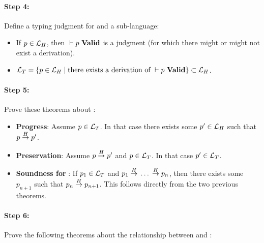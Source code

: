 \paragraph{Step 4:} Define a typing judgment for \highlang and a sub-language:

\begin{itemize}
\item If $p \in \mathcal{L}_H$, then ${} |- {p}\ \mathbf{Valid}$ is a judgment (for which there
  might or might not exist a derivation).
\item
  $\mathcal{L}_T = \{p \in \mathcal{L}_H \mid \text{there exists a derivation of\ }
    {} |- {p}\ \mathbf{Valid}\} \subset \mathcal{L}_H$.
\end{itemize}

\paragraph{Step 5:} Prove these theorems about \highlang:

\begin{itemize}
\item \textbf{Progress}: Assume $p \in \mathcal{L}_T$. In that case there exists
  some $p' \in \mathcal{L}_H$ such that $p {{}\stackrel{H}{->}{}} p'$.
\item \textbf{Preservation}: Assume $p {{}\stackrel{H}{->}{}} p'$ and $p \in \mathcal{L}_T$. In
  that case $p' \in \mathcal{L}_T$.
\item \textbf{Soundness for \highlang}: If $p_1 \in \mathcal{L}_T$ and
  $p_1 {{}\stackrel{H}{->}{}} \dots {{}\ensuremath{\stackrel{H}{->}}{}} p_n$, then there exists some $p_{n+1}$ such that
  $p_n {{}\stackrel{H}{->}{}} p_{n+1}$. This follows directly from the two previous
  theorems.
\end{itemize}

\paragraph{Step 6:} Prove the following theorems about the relationship between
\highlang and \simplelang:

